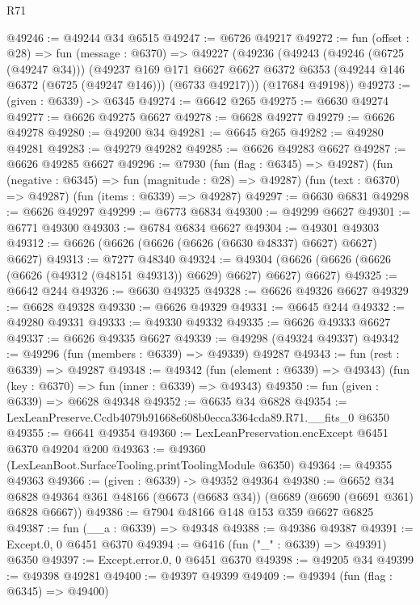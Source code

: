 \begin{lexlean}{R71}
\begin{coremodule}
@49246 := @49244 @34 @6515
@49247 := @6726 @49217
@49272 := fun (offset : @28) =>
  fun (message : @6370) =>
  @49227
    (@49236
      (@49243
        (@49246 (@6725 (@49247 @34)))
        (@49237
          @169
          @171
          @6627
          @6627
          @6372
          @6353
          (@49244 @146 @6372 (@6725 (@49247 @146)))
          (@6733 @49217)))
      (@17684 @49198))
@49273 := (given : @6339) -> @6345
@49274 := @6642 @265
@49275 := @6630 @49274
@49277 := @6626 @49275 @6627
@49278 := @6628 @49277
@49279 := @6626 @49278
@49280 := @49200 @34
@49281 := @6645 @265
@49282 := @49280 @49281
@49283 := @49279 @49282
@49285 := @6626 @49283 @6627
@49287 := @6626 @49285 @6627
@49296 := @7930
    (fun (flag : @6345) => @49287)
    (fun (negative : @6345) => fun (magnitude : @28) => @49287)
    (fun (text : @6370) => @49287)
    (fun (items : @6339) => @49287)
@49297 := @6630 @6831
@49298 := @6626 @49297
@49299 := @6773 @6834
@49300 := @49299 @6627
@49301 := @6771 @49300
@49303 := @6784 @6834 @6627
@49304 := @49301 @49303
@49312 := @6626 (@6626 (@6626 (@6626 (@6630 @48337) @6627) @6627) @6627)
@49313 := @7277 @48340
@49324 := @49304 (@6626 (@6626 (@6626 (@6626 (@49312 (@48151 @49313)) @6629) @6627) @6627) @6627)
@49325 := @6642 @244
@49326 := @6630 @49325
@49328 := @6626 @49326 @6627
@49329 := @6628 @49328
@49330 := @6626 @49329
@49331 := @6645 @244
@49332 := @49280 @49331
@49333 := @49330 @49332
@49335 := @6626 @49333 @6627
@49337 := @6626 @49335 @6627
@49339 := @49298 (@49324 @49337)
@49342 := @49296 (fun (members : @6339) => @49339) @49287
@49343 := fun (rest : @6339) => @49287
@49348 := @49342
    (fun (element : @6339) => @49343)
    (fun (key : @6370) => fun (inner : @6339) => @49343)
@49350 := fun (given : @6339) => @6628 @49348
@49352 := @6635 @34 @6828
@49354 := LexLeanPreserve.Ccdb4079b91668e608b0ecca3364cda89.R71.__fits_0 @6350
@49355 := @6641 @49354
@49360 := LexLeanPreservation.encExcept @6451 @6370 @49204 @200
@49363 := @49360 (LexLeanBoot.SurfaceTooling.printToolingModule @6350)
@49364 := @49355 @49363
@49366 := (given : @6339) -> @49352 @49364
@49380 := @6652
    @34
    @6828
    @49364
    @361
    @48166
    (@6673 (@6683 @34))
    (@6689 (@6690 (@6691 @361) @6828 @6667))
@49386 := @7904 @48166 @148 @153 @359 @6627 @6825
@49387 := fun (__a : @6339) => @49348
@49388 := @49386 @49387
@49391 := Except.{0, 0} @6451 @6370
@49394 := @6416 (fun ("_" : @6339) => @49391) @6350
@49397 := Except.error.{0, 0} @6451 @6370
@49398 := @49205 @34
@49399 := @49398 @49281
@49400 := @49397 @49399
@49409 := @49394
    (fun (flag : @6345) => @49400)

\end{coremodule}
\end{lexlean}
